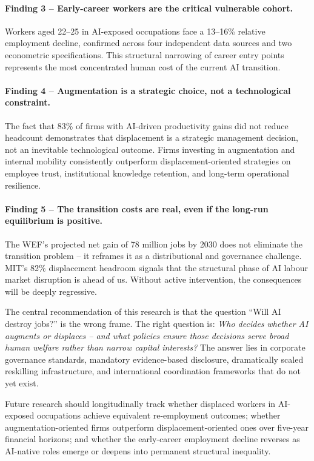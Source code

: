 \documentclass[12pt, a4paper]{article}
\begin{document}
\paragraph{Finding 3 -- Early-career workers are the critical vulnerable cohort.}
Workers aged 22--25 in AI-exposed occupations face a 13--16\% relative employment decline,
confirmed across four independent data sources and two econometric specifications. This
structural narrowing of career entry points represents the most concentrated human cost of
the current AI transition.

\paragraph{Finding 4 -- Augmentation is a strategic choice, not a technological constraint.}
The fact that 83\% of firms with AI-driven productivity gains did not reduce headcount
\citep{ey2025} demonstrates that displacement is a strategic management decision, not an
inevitable technological outcome. Firms investing in augmentation and internal mobility
consistently outperform displacement-oriented strategies on employee trust, institutional
knowledge retention, and long-term operational resilience.

\paragraph{Finding 5 -- The transition costs are real, even if the long-run equilibrium is positive.}
The WEF's projected net gain of 78 million jobs by 2030 does not eliminate the transition
problem -- it reframes it as a distributional and governance challenge. MIT's 82\%
displacement headroom signals that the structural phase of AI labour market disruption is
ahead of us. Without active intervention, the consequences will be deeply regressive.

\bigskip
The central recommendation of this research is that the question ``Will AI destroy jobs?''
is the wrong frame. The right question is: \emph{Who decides whether AI augments or
displaces -- and what policies ensure those decisions serve broad human welfare rather than
narrow capital interests?} The answer lies in corporate governance standards, mandatory
evidence-based disclosure, dramatically scaled reskilling infrastructure, and international
coordination frameworks that do not yet exist.

Future research should longitudinally track whether displaced workers in AI-exposed occupations
achieve equivalent re-employment outcomes; whether augmentation-oriented firms outperform
displacement-oriented ones over five-year financial horizons; and whether the early-career
employment decline reverses as AI-native roles emerge or deepens into permanent structural
inequality.
\end{document}

